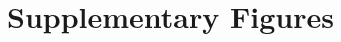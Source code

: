 \documentclass[letterpaper]{article}
\begin{document}



\FloatBarrier




\appendix
\section{Supplementary Figures}
\end{document}
